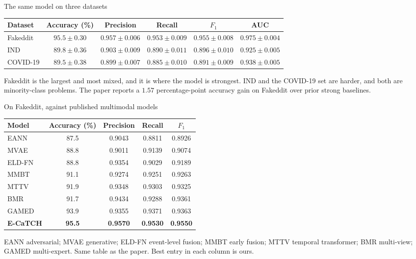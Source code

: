 \begin{frame}{The same model on three datasets}
  {\small
  \begin{center}
    \renewcommand{\arraystretch}{1.18}
    \begin{tabular}{lccccc}
      \toprule
      Dataset & Accuracy (\%) & Precision & Recall & $F_1$ & AUC \\
      \midrule
      Fakeddit & $95.5\pm 0.30$ & $0.957\pm 0.006$ & $0.953\pm 0.009$ & $0.955\pm 0.008$ & $0.975\pm 0.004$ \\
      IND & $89.8\pm 0.36$ & $0.903\pm 0.009$ & $0.890\pm 0.011$ & $0.896\pm 0.010$ & $0.925\pm 0.005$ \\
      COVID-19 & $89.5\pm 0.38$ & $0.899\pm 0.007$ & $0.885\pm 0.010$ & $0.891\pm 0.009$ & $0.938\pm 0.005$ \\
      \bottomrule
    \end{tabular}
  \end{center}
  }
  \vspace{0.7em}
  Fakeddit is the largest and most mixed, and it is where the model is strongest.
  IND and the COVID-19 set are harder, and both are minority-class problems.
  The paper reports a $1.57$ percentage-point accuracy gain on Fakeddit over prior strong baselines.
\end{frame}

\begin{frame}{On Fakeddit, against published multimodal models}
  {\footnotesize
  \begin{center}
    \renewcommand{\arraystretch}{1.12}
    \begin{tabular}{lcccc}
      \toprule
      Model & Accuracy (\%) & Precision & Recall & $F_1$ \\
      \midrule
      EANN   & 87.5 & 0.9043 & 0.8811 & 0.8926 \\
      MVAE   & 88.8 & 0.9011 & 0.9139 & 0.9074 \\
      ELD-FN & 88.8 & 0.9354 & 0.9029 & 0.9189 \\
      MMBT   & 91.1 & 0.9274 & 0.9251 & 0.9263 \\
      MTTV   & 91.9 & 0.9348 & 0.9303 & 0.9325 \\
      BMR    & 91.7 & 0.9434 & 0.9288 & 0.9361 \\
      GAMED  & 93.9 & 0.9355 & 0.9371 & 0.9363 \\
      \textbf{E-CaTCH} & \textbf{95.5} & \textbf{0.9570} & \textbf{0.9530} & \textbf{0.9550} \\
      \bottomrule
    \end{tabular}
  \end{center}
  }
  \vspace{0.35em}
  {\scriptsize\color{muted}
    EANN adversarial; MVAE generative; ELD-FN event-level fusion; MMBT early fusion;
    MTTV temporal transformer; BMR multi-view; GAMED multi-expert.
    Same table as the paper. Best entry in each column is ours.}
\end{frame}


